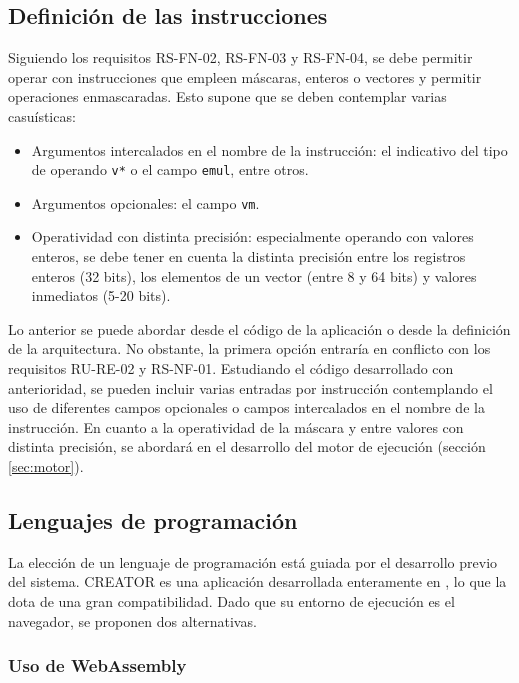 \subsection{Definición de las instrucciones}\label{subsec:defi-ins}

Siguiendo los requisitos RS-FN-02, RS-FN-03 y RS-FN-04, se debe permitir operar con instrucciones que empleen máscaras, enteros o vectores y permitir operaciones enmascaradas. Esto supone que se deben contemplar varias casuísticas:

\begin{itemize}
\item Argumentos intercalados en el nombre de la instrucción: el indicativo del tipo de operando \texttt{v*} o el campo \texttt{emul}, entre otros.
\item Argumentos opcionales: el campo \texttt{vm}.
\item Operatividad con distinta precisión: especialmente operando con valores enteros, se debe tener en cuenta la distinta precisión entre los registros enteros (32 bits), los elementos de un vector (entre 8 y 64 bits) y valores inmediatos (5-20 bits).
\end{itemize}

Lo anterior se puede abordar desde el código de la aplicación o desde la definición de la arquitectura. No obstante, la primera opción entraría en conflicto con los requisitos RU-RE-02 y RS-NF-01. Estudiando el código desarrollado con anterioridad, se pueden incluir varias entradas por instrucción contemplando el uso de diferentes campos opcionales o campos intercalados en el nombre de la instrucción. En cuanto a la operatividad de la máscara y entre valores con distinta precisión, se abordará en el desarrollo del motor de ejecución (sección \ref{sec:motor}).

\subsection{Lenguajes de programación}{\label{subsec:programming-languages}}
La elección de un lenguaje de programación está guiada por el desarrollo previo
del sistema. CREATOR es una aplicación desarrollada enteramente en
\js, lo que la dota de una gran
compatibilidad. Dado que su entorno de ejecución es el navegador, se proponen
dos alternativas.

\subsubsection{Uso de WebAssembly}


